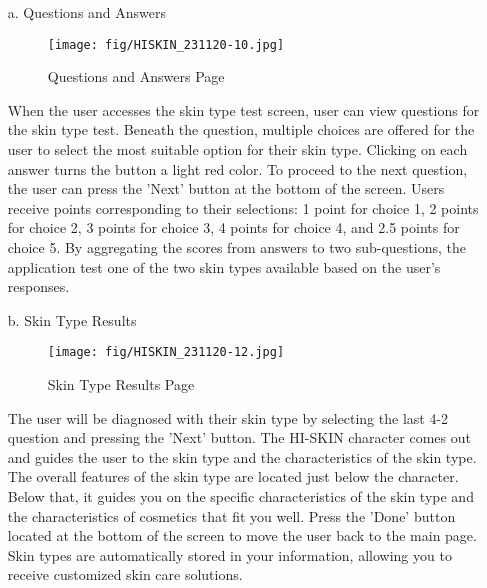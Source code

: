 \documentclass[conference]{IEEEtran}
\begin{document}
\begin{itemize}
    \item[a.]Questions and Answers
    \begin{figure}[h]
    \centering
    \texttt{[image: fig/HISKIN\_231120-10.jpg]}
    \label{fig:Questions and Answers}
    \caption{Questions and Answers Page} 
    \end{figure}
    \item[]When the user accesses the skin type test screen, user can view questions for the skin type test. Beneath the question, multiple choices are offered for the user to select the most suitable option for their skin type. Clicking on each answer turns the button a light red color. To proceed to the next question, the user can press the 'Next' button at the bottom of the screen. Users receive points corresponding to their selections: 1 point for choice 1, 2 points for choice 2, 3 points for choice 3, 4 points for choice 4, and 2.5 points for choice 5. By aggregating the scores from answers to two sub-questions, the application test one of the two skin types available based on the user's responses. \\ 

    \item[b.]Skin Type Results
    \begin{figure}[h]
    \centering
    \texttt{[image: fig/HISKIN\_231120-12.jpg]}
    \label{fig:Skin Type Results Page}
    \caption{Skin Type Results Page} 
    \end{figure}
    \item[]The user will be diagnosed with their skin type by selecting the last 4-2 question and pressing the 'Next' button. The HI-SKIN character comes out and guides the user to the skin type and the characteristics of the skin type. The overall features of the skin type are located just below the character. Below that, it guides you on the specific characteristics of the skin type and the characteristics of cosmetics that fit you well. Press the 'Done' button located at the bottom of the screen to move the user back to the main page. Skin types are automatically stored in your information, allowing you to receive customized skin care solutions. \\ 
\end{itemize}
\clearpage
\end{document}
